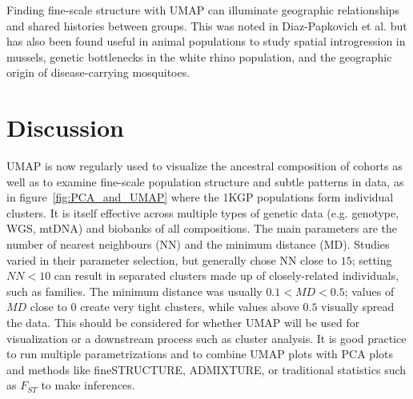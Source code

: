 \documentclass[12pt]{article}
\begin{document}
Finding fine-scale structure with UMAP can illuminate geographic relationships and shared histories between groups. This was noted in Diaz-Papkovich et al.\cite{diaz-papkovich_umap_2019} but has also been found useful in animal populations to study spatial introgression in mussels\cite{simon_local_2019}, genetic bottlenecks in the white rhino population\cite{sanchez-barreiro_historical_2020}, and the geographic origin of disease-carrying mosquitoes\cite{consortium_genome_2020}\cite{schmidt_population_2020}.

\section*{Discussion}

UMAP is now regularly used to visualize the ancestral composition of cohorts as well as to examine fine-scale population structure and subtle patterns in data, as in figure~\ref{fig:PCA_and_UMAP} where the 1KGP populations form individual clusters. It is itself effective across multiple types of genetic data (e.g. genotype, WGS, mtDNA) and biobanks of all compositions. The main parameters are the number of nearest neighbours (NN) and the minimum distance (MD). Studies varied in their parameter selection, but generally chose NN close to $15$; setting $NN < 10$ can result in separated clusters made up of closely-related individuals, such as families. The minimum distance was usually $0.1 < MD < 0.5$; values of $MD$ close to $0$ create very tight clusters, while values above $0.5$ visually spread the data. This should be considered for whether UMAP will be used for visualization or a downstream process such as cluster analysis. It is good practice to run multiple parametrizations and to combine UMAP plots with PCA plots and methods like fineSTRUCTURE\cite{lawson2012inference}, ADMIXTURE\cite{alexander2009fast}, or traditional statistics such as $F_{ST}$ to make inferences.
\end{document}
